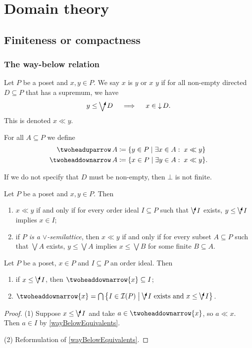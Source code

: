 \chapter{Domain theory}
\section{Finiteness or compactness}
\subsection{The way-below relation}
\begin{definition}
Let $P$ be a poset and $x,y\in P$. We say $x$ is  $y$ or $x$  $y$ if for all non-empty directed $D\subseteq P$ that has a supremum, we have
\[ y\leq \dirvee D \quad\implies\quad x\in \downset D. \]
This is denoted $x\ll y$.

For all $A\subseteq P$ we define
\begin{align*}
\uupset A &\defeq \setbuilder{y\in P}{\exists x\in A: \; x \ll y} \\
\ddownset A &\defeq \setbuilder{x\in P}{\exists y\in A: \; x \ll y}.
\end{align*}
\end{definition}
If we do not specify that $D$ must be non-empty, then $\bot$ is not finite.

\begin{lemma} \label{wayBelowEquivalents}
Let $P$ be a poset and $x,y\in P$. Then
\begin{enumerate}
\item $x \ll y$ \textup{if and only if} for every order ideal $I\subseteq P$ such that $\dirvee I$ exists, $y\leq \dirvee I$ implies $x\in I$;
\item if \emph{$P$ is a $\vee$-semilattice}, then $x \ll y$ \textup{if and only if} for every subset $A\subseteq P$ such that $\bigvee A$ exists, $y\leq \bigvee A$ implies $x\leq \bigvee B$ for some finite $B\subseteq A$.
\end{enumerate}
\end{lemma}

\begin{lemma} \label{principalDdownsetInclusionProperty}
Let $P$ be a poset, $x\in P$ and $I\subseteq P$ an order ideal. Then
\begin{enumerate}
\item if $x\leq \dirvee I$, then $\ddownset\{x\} \subseteq I$;
\item $\ddownset\{x\} = \bigcap \setbuilder{I\in\ideals(P)}{\text{$\dirvee I$ exists and $x\leq \dirvee I$}}$.
\end{enumerate}
\end{lemma}
\begin{proof}
(1) Suppose $x\leq \dirvee I$ and take $a \in\ddownset\{x\}$, so $a \ll x$. Then $a\in I$ by \ref{wayBelowEquivalents}.

(2) Reformulation of \ref{wayBelowEquivalents}.
\end{proof}

